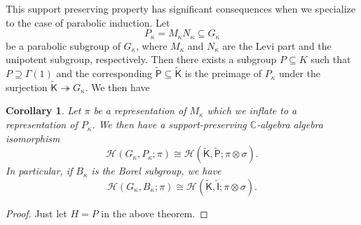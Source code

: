 \documentclass[10pt, letterpaper]{amsart}
\theoremstyle{plain}
\newtheorem{Cor}[equation]{Corollary}
\theoremstyle{definition}
\numberwithin{equation}{section}
\newcommand{\C}{\mathbb{C}}
\newcommand{\htt}{\tilde{h}}
\newcommand{\Ht}{\widetilde{H}}
\newcommand{\gt}{\tilde{g}}
\newcommand{\kt}{\tilde{k}}
\newcommand{\Hom}{\operatorname{Hom}}
\newcommand{\Hcal}{\mathcal{H}}
\newcommand{\Ift}{\widetilde{\mathsf{I}}}
\newcommand{\Kft}{\widetilde{\mathsf{K}}}
\newcommand{\Pft}{\widetilde{\mathsf{P}}}
\begin{document}

This support preserving property has significant consequences when we specialize to the case of parabolic induction. Let
\[
P_\kappa=M_\kappa N_\kappa\subseteq G_\kappa
\]
be a parabolic subgroup of $G_\kappa$, where $M_\kappa$ and $N_\kappa$ are the Levi part and the unipotent subgroup, respectively. Then there exists a subgroup $P\subseteq K$ such that $P\supseteq\Gamma (1)$ and the corresponding $\Pft\subseteq\Kft$ is the preimage of $P_\kappa$ under the surjection $\Kft\twoheadrightarrow G_\kappa$.  We then have

\begin{Cor}\label{ParaHeckeIso}
Let $\pi$ be a representation of $M_\kappa$ which we inflate to a representation of $P_\kappa$. We then have a support-preserving $\C$-algebra algebra isomorphism 
\[
\Hcal(G_{\kappa},P_{\kappa};\pi)\cong\Hcal(\Kft,\Pft;\pi\otimes \sigma).
\]
In particular, if $B_\kappa$ is the Borel subgroup, we have
\[
\Hcal(G_{\kappa},B_{\kappa};\pi)\cong\Hcal(\Kft,\Ift;\pi\otimes \sigma).
\]
\end{Cor}
\begin{proof}
    Just let $H=P$ in the above theorem.
\end{proof}
\end{document}
